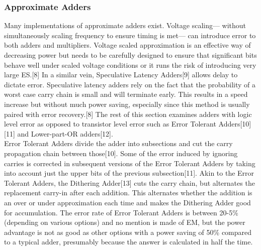 \documentclass[journal]{IEEEtran}
\begin{document}
	\subsubsection{Approximate Adders}
	\indent Many implementations of approximate adders exist. Voltage scaling--- without simultaneously scaling frequency to ensure timing is met--- can introduce error to both adders and multipliers. Voltage scaled approximation is an effective way of decreasing power but needs to be carefully designed to ensure that significant bits behave well under scaled voltage conditions or it runs the risk of introducing very large ES.[8] In a similar vein, Speculative Latency Adders[9] allows delay to dictate error. Speculative latency adders rely on the fact that the probability of a worst case carry chain is small and will terminate early. This results in a speed increase but without much power saving, especially since this method is usually paired with error recovery.[8] The rest of this section examines adders with logic level error as opposed to transistor level error such as Error Tolerant Adders[10][11] and Lower-part-OR adders[12]. \\
	\indent Error Tolerant Adders divide the adder into subsections and cut the carry propagation chain between those[10]. Some of the error induced by ignoring carries is corrected in subsequent versions of the Error Tolerant Adders by taking into account just the upper bits of the previous subsection[11]. Akin to the Error Tolerant Adders, the Dithering Adder[13] cuts the carry chain, but alternates the replacement carry-in after each addition. This alternates whether the addition is an over or under approximation each time and makes the Dithering Adder good for accumulation. The error rate of Error Tolerant Adders is between 20-5\% (depending on various options) and no mention is made of EM, but the power advantage is not as good as other options with a power saving of 50\% compared to a typical adder, presumably because the answer is calculated in half the time.
\end{document}
